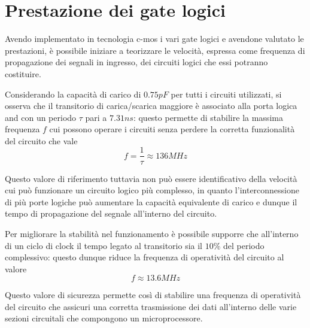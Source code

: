 \section{Prestazione dei gate logici}
	Avendo implementato in tecnologia c-mos i vari gate logici e avendone valutato le prestazioni, è possibile iniziare a teorizzare le velocità, espressa come frequenza di propagazione dei segnali in ingresso, dei circuiti logici che essi potranno costituire.
	
	Considerando la capacità di carico di $0.75pF$ per tutti i circuiti utilizzati, si osserva che il transitorio di carica/scarica maggiore è associato alla porta logica and con un periodo $\tau$ pari a $7.31ns$: questo permette  di stabilire la massima frequenza $f$ cui possono operare i circuiti senza perdere la corretta funzionalità del circuito che vale
	\[ f = \frac 1 \tau \approx 136 MHz\]
	
	Questo valore di riferimento tuttavia non può essere identificativo della velocità cui può funzionare un circuito logico più complesso, in quanto l'interconnessione di più porte logiche può aumentare la capacità equivalente di carico e dunque il tempo di propagazione del segnale all'interno del circuito.
	
	Per migliorare la stabilità nel funzionamento è possibile supporre che all'interno di un ciclo di clock il tempo legato al transitorio sia il $10\%$ del periodo complessivo: questo dunque riduce la frequenza di operatività del circuito al valore
	\[ f \approx 13.6 MHz \]
	
	Questo valore di sicurezza permette così di stabilire una frequenza di operatività del circuito che assicuri una corretta trasmissione dei dati all'interno delle varie sezioni circuitali che compongono un microprocessore.
	
	
	
















